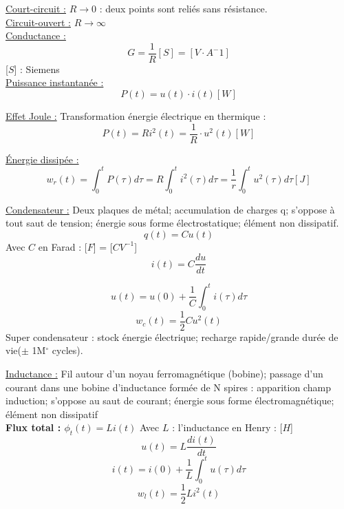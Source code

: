 \documentclass[../main.tex]{subfiles}
\begin{document}
\quad \underline{Court-circuit :} $R\rightarrow 0$ : deux points sont reliés sans résistance.\\

\quad \underline{Circuit-ouvert :} $R\rightarrow \infty$\\

\quad \underline{Conductance :} 
\begin{equation}
    G = \frac{1}{R} [S] = [V\cdot A^-1]
\end{equation}
[$S$] : Siemens\\


\quad \underline{Puissance instantanée :}
\begin{equation}
    P(t) = u(t)\cdot i(t) [W]
\end{equation}

\quad \underline{Effet Joule :} Transformation énergie électrique en thermique : 
\begin{equation}
    P(t) = Ri^2(t) = \frac{1}{R}\cdot u^2(t) [W]
\end{equation}

\quad \underline{Énergie dissipée :}
\begin{equation}
    w_r(t) = \int_0^t P(\tau) d\tau = R\int_0^ti^2(\tau) d\tau = \frac{1}{r} \int_0^t u^2(\tau)d\tau [J]
\end{equation}

\quad \underline{Condensateur :} Deux plaques de métal; accumulation de charges q; s'oppose à tout saut de tension; énergie sous forme électrostatique; élément non dissipatif.
\begin{equation}
    q(t) = C u(t)
\end{equation}
Avec $C$ en Farad : [$F$] = [$CV^{-1}$]
\begin{equation}
        i(t) = C \frac{du}{dt}
\end{equation}

\begin{equation}
    u(t) = u(0) + \frac{1}{C} \int_0^t i(\tau)d\tau
\end{equation}
\begin{equation}
    w_c(t) = \frac{1}{2}Cu^2(t)
\end{equation}
\color{gray}
Super condensateur : stock énergie électrique; recharge rapide/grande durée de vie($\pm$ 1M$^{\circ}$ cycles).\\
\color{black}

\quad \underline{Inductance :} Fil autour d'un noyau ferromagnétique (bobine); passage d'un courant dans une bobine d'inductance formée de N spires : apparition champ induction; s'oppose au saut de courant; énergie sous forme électromagnétique; élément non dissipatif\\
\textbf{Flux total : $\phi_t(t) = Li(t)$} Avec $L$ : l'inductance en Henry : [$H$]
\begin{equation}
    u(t) = L \frac{di(t)}{dt}
\end{equation}
\begin{equation}
    i(t) = i(0) + \frac{1}{L}\int_0^tu(\tau)d\tau
\end{equation}
\begin{equation}
    w_l(t) = \frac{1}{2}Li^2(t)
\end{equation}
\end{document}
